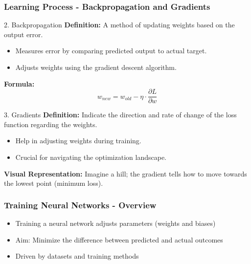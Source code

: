 \documentclass{beamer}
\begin{document}
\begin{frame}[fragile]
    \frametitle{Learning Process - Backpropagation and Gradients}
    \begin{block}{2. Backpropagation}
        \textbf{Definition:} A method of updating weights based on the output error.
        \begin{itemize}
            \item Measures error by comparing predicted output to actual target.
            \item Adjusts weights using the gradient descent algorithm.
        \end{itemize}
        
        \textbf{Formula:}
        \begin{equation}
            w_{new} = w_{old} - \eta \cdot \frac{\partial L}{\partial w}
        \end{equation}
    \end{block}

    \begin{block}{3. Gradients}
        \textbf{Definition:} Indicate the direction and rate of change of the loss function regarding the weights.
        \begin{itemize}
            \item Help in adjusting weights during training.
            \item Crucial for navigating the optimization landscape.
        \end{itemize}
    \end{block}

    \textbf{Visual Representation:} Imagine a hill; the gradient tells how to move towards the lowest point (minimum loss).
\end{frame}

\begin{frame}[fragile]
    \frametitle{Training Neural Networks - Overview}
    \begin{itemize}
        \item Training a neural network adjusts parameters (weights and biases) 
        \item Aim: Minimize the difference between predicted and actual outcomes
        \item Driven by datasets and training methods
    \end{itemize}
\end{frame}
\end{document}
